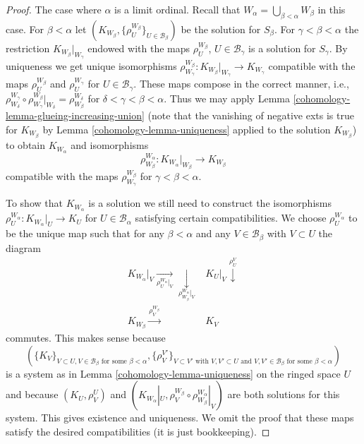\begin{proof}
\medskip\noindent
The case where $\alpha$ is a limit ordinal. Recall that
$W_\alpha = \bigcup_{\beta < \alpha} W_\beta$ in this case.
For $\beta < \alpha$ let
$(K_{W_\beta}, \{\rho^{W_\beta}_U\}_{U \in \mathcal{B}_\beta})$
be the solution for $S_\beta$.
For $\gamma < \beta < \alpha$ the restriction
$K_{W_\beta}|_{W_\gamma}$ endowed with the maps
$\rho^{W_\beta}_U$, $U \in \mathcal{B}_\gamma$
is a solution for $S_\gamma$. By uniqueness we get unique isomorphisms
$\rho_{W_\gamma}^{W_\beta} : K_{W_\beta}|_{W_\gamma} \to K_{W_\gamma}$
compatible with the maps $\rho^{W_\beta}_U$ and $\rho^{W_\gamma}_U$
for $U \in \mathcal{B}_\gamma$. These maps compose in the correct manner,
i.e., $\rho_{W_\delta}^{W_\gamma} \circ \rho_{W_\gamma}^{W_\beta}|_{W_\delta}
= \rho^{W_\delta}_{W_\beta}$ for $\delta < \gamma < \beta < \alpha$.
Thus we may apply Lemma \ref{cohomology-lemma-glueing-increasing-union}
(note that the vanishing of negative exts is true for
$K_{W_\beta}$ by Lemma \ref{cohomology-lemma-uniqueness} applied
to the solution $K_{W_\beta}$)
to obtain $K_{W_\alpha}$ and isomorphisms
$$
\rho_{W_\beta}^{W_\alpha} :
K_{W_\alpha}|_{W_\beta}
\longrightarrow
K_{W_\beta}
$$
compatible with the maps $\rho_{W_\gamma}^{W_\beta}$ for
$\gamma < \beta < \alpha$.

\medskip\noindent
To show that $K_{W_\alpha}$ is a solution we still need to construct the
isomorphisms $\rho_U^{W_\alpha} : K_{W_\alpha}|_U \to K_U$ for
$U \in \mathcal{B}_\alpha$ satisfying certain compatibilities.
We choose $\rho_U^{W_\alpha}$ to be the unique map such that
for any $\beta < \alpha$ and any $V \in \mathcal{B}_\beta$
with $V \subset U$ the diagram
$$
\begin{array}{cc}K_{W_\alpha}|_V \underset{\rho_U^{W_\alpha}|_V}{\longrightarrow}\underset{\rho_{W_\beta}^{W_\alpha}|_V}{\downarrow} & K_U|_V \overset{\rho_U^V}{\downarrow} \\ K_{W_\beta} \overset{\rho_V^{W_\beta}}{\longrightarrow} & K_V\end{array}
$$
commutes. This makes sense because
$$
(\{K_V\}_{V \subset U, V \in \mathcal{B}_\beta\text{ for some }\beta < \alpha},
\{\rho_V^{V'}\}_{V \subset V'\text{ with }V, V' \subset U
\text{ and }V, V' \in \mathcal{B}_\beta\text{ for some }\beta < \alpha})
$$
is a system as in Lemma \ref{cohomology-lemma-uniqueness} on the ringed space $U$
and because $(K_U, \rho^U_V)$ and
$(K_{W_\alpha}|_U,  \rho_V^{W_\beta}\circ \rho_{W_\beta}^{W_\alpha}|_V)$
are both solutions for this system. This gives existence and uniqueness.
We omit the proof that these
maps satisfy the desired compatibilities (it is just bookkeeping).
\end{proof}


